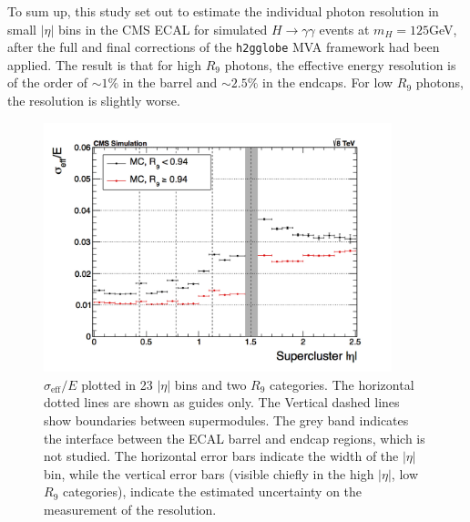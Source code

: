 \documentclass[10pt]{article}
\begin{document}
To sum up, this study set out to estimate the individual photon resolution in small $|\eta|$ bins in the CMS ECAL for simulated $H \rightarrow \gamma \gamma$ events at $m_H =125$GeV, after the full and final corrections of the \texttt{h2gglobe} MVA framework had been applied. The result is that for high $R_9$ photons, the effective energy resolution is of the order of $\sim 1\%$ in the barrel and $\sim 2.5\%$ in the endcaps. For low $R_9$ photons, the resolution is slightly worse.

\begin{figure}[h!]
\centering
\includegraphics[width=0.9\textwidth]{"EffSigma_vs_eta_mva"}
\caption{$\sigma_{\text{eff}}/E$ plotted in 23 $|\eta|$ bins and two $R_9$ categories. The horizontal dotted lines are shown as guides only. The Vertical dashed lines show boundaries between supermodules. The grey band indicates the interface between the ECAL barrel and endcap regions, which is not studied. The horizontal error bars indicate the width of the $|\eta|$ bin, while the vertical error bars (visible chiefly in the high $|\eta|$, low $R_{9}$ categories), indicate the estimated uncertainty on the measurement of the resolution.}
\label{mainPlot}
\end{figure}
\end{document}
